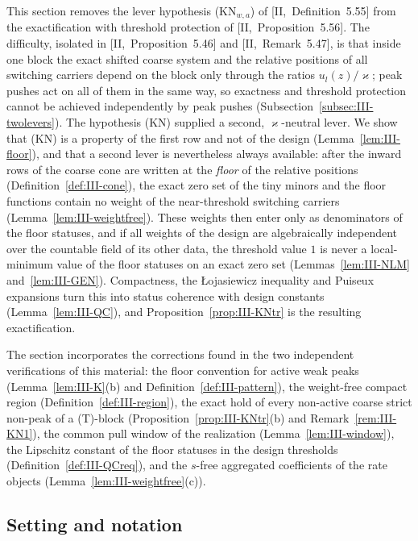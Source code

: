 \documentclass[10pt]{amsart}
\theoremstyle{definition}
\theoremstyle{remark}
\newcommand{\zh}{\hat z}
\begin{document}
This section removes the lever hypothesis (KN$_{w,a}$) of
[II,~Definition~5.55] from the exactification with threshold protection of
[II,~Proposition~5.56].  The difficulty, isolated in [II,~Proposition~5.46]
and [II,~Remark~5.47], is that inside one block the exact shifted coarse
system and the relative positions of all switching carriers depend on the
block only through the ratios $u_l(\zh)/\varkappa$; peak pushes act on all of
them in the same way, so exactness and threshold protection cannot be
achieved independently by peak pushes (Subsection~\ref{subsec:III-twolevers}).
The hypothesis (KN) supplied a second, $\varkappa$-neutral lever.  We show
that (KN) is a property of the first row and not of the design
(Lemma~\ref{lem:III-floor}), and that a second lever is nevertheless always
available: after the inward rows of the coarse cone are written at the
\emph{floor} of the relative positions (Definition~\ref{def:III-cone}), the
exact zero set of the tiny minors and the floor functions contain no weight
of the near-threshold switching carriers (Lemma~\ref{lem:III-weightfree}).
These weights then enter only as denominators of the floor statuses, and if
all weights of the design are algebraically independent over the countable
field of its other data, the threshold value $1$ is never a local-minimum
value of the floor statuses on an exact zero set
(Lemmas~\ref{lem:III-NLM} and~\ref{lem:III-GEN}).  Compactness, the
{\L}ojasiewicz inequality and Puiseux expansions turn this into status
coherence with design constants (Lemma~\ref{lem:III-QC}), and
Proposition~\ref{prop:III-KNtr} is the resulting exactification.

The section incorporates the corrections found in the two independent
verifications of this material: the floor convention for active weak peaks
(Lemma~\ref{lem:III-K}(b) and Definition~\ref{def:III-pattern}), the
weight-free compact region (Definition~\ref{def:III-region}), the exact hold
of every non-active coarse strict non-peak of a (T)-block
(Proposition~\ref{prop:III-KNtr}(b) and Remark~\ref{rem:III-KN1}), the
common pull window of the realization (Lemma~\ref{lem:III-window}), the
Lipschitz constant of the floor statuses in the design thresholds
(Definition~\ref{def:III-QCreq}), and the $s$-free aggregated coefficients of
the rate objects (Lemma~\ref{lem:III-weightfree}(c)).

\subsection{Setting and notation}\label{subsec:III-gen-setting}
\end{document}
